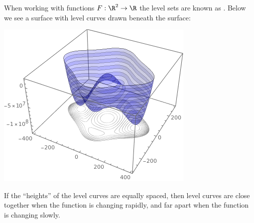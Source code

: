 \documentclass{ximera}
\begin{document}
When working with functions $F:\R^2\to\R$ the level sets are known as
.  Below we see a surface with level curves drawn
beneath the surface:

\begin{image}
  \includegraphics{firstContourPlot.png}
\end{image}

If the ``heights'' of the level curves are equally spaced, then level
curves are close together when the function is changing rapidly, and
far apart when the function is changing slowly.
\end{document}
